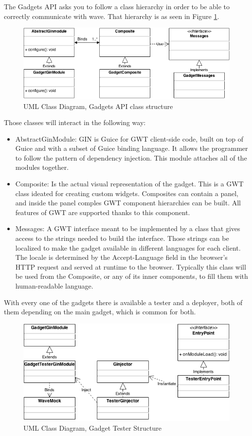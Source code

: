 The Gadgets API asks you to follow a class hierarchy in order to be able to correctly communicate with wave. That hierarchy is as seen in Figure \ref{fig:gadget_classes}.\\[.2cm]
\begin{figure}[h]
  \center
    \includegraphics[keepaspectratio, scale=0.5]{Media/Diagrams/Gadget/Gadget.png}
  \caption{UML Class Diagram, Gadgets API class structure}
  \label{fig:gadget_classes}
\end{figure}
Those classes will interact in the following way:
\begin{itemize}
  \item AbstractGinModule: GIN is Guice for GWT client-side code, built on top of Guice and with a subset of Guice binding language. It allows the programmer to follow the pattern of dependency injection. This module attaches all of the modules together.
  \item Composite: Is the actual visual representation of the gadget. This is a GWT class ideated for creating custom widgets. Composites can contain a panel, and inside the panel comples GWT component hierarchies can be built. All features of GWT are supported thanks to this component.
  \item Messages: A GWT interface meant to be implemented by a class that gives access to the strings needed to build the interface. Those strings can be localized to make the gadget available in different languages for each client. The locale is determined by the Accept-Language field in the browser's HTTP request \cite{ref:gwt_internationalization} and served at runtime to the browser. Typically this class will be used from the Composite, or any of its inner components, to fill them with human-readable language.
\end{itemize}
With every one of the gadgets there is available a tester and a deployer, both of them depending on the main gadget, which is common for both.
\begin{figure}[H]
  \center
    \includegraphics[keepaspectratio, scale=0.5]{Media/Diagrams/Gadget/Tester.png}
  \caption{UML Class Diagram, Gadget Tester Structure}
  \label{fig:gadget_tester}
\end{figure}
